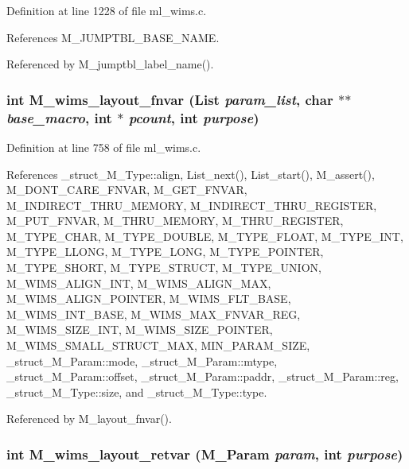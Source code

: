 Definition at line 1228 of file ml\_\-wims.c.

References M\_\-JUMPTBL\_\-BASE\_\-NAME.

Referenced by M\_\-jumptbl\_\-label\_\-name().
\subsubsection{\setlength{\rightskip}{0pt plus 5cm}int M\_\-wims\_\-layout\_\-fnvar (\bf{List} {\em param\_\-list}, char $\ast$$\ast$ {\em base\_\-macro}, int $\ast$ {\em pcount}, int {\em purpose})}\label{ml__wims_8c_89f126df7c79a4237631ff3654f631d0}




Definition at line 758 of file ml\_\-wims.c.

References \_\-struct\_\-M\_\-Type::align, List\_\-next(), List\_\-start(), M\_\-assert(), M\_\-DONT\_\-CARE\_\-FNVAR, M\_\-GET\_\-FNVAR, M\_\-INDIRECT\_\-THRU\_\-MEMORY, M\_\-INDIRECT\_\-THRU\_\-REGISTER, M\_\-PUT\_\-FNVAR, M\_\-THRU\_\-MEMORY, M\_\-THRU\_\-REGISTER, M\_\-TYPE\_\-CHAR, M\_\-TYPE\_\-DOUBLE, M\_\-TYPE\_\-FLOAT, M\_\-TYPE\_\-INT, M\_\-TYPE\_\-LLONG, M\_\-TYPE\_\-LONG, M\_\-TYPE\_\-POINTER, M\_\-TYPE\_\-SHORT, M\_\-TYPE\_\-STRUCT, M\_\-TYPE\_\-UNION, M\_\-WIMS\_\-ALIGN\_\-INT, M\_\-WIMS\_\-ALIGN\_\-MAX, M\_\-WIMS\_\-ALIGN\_\-POINTER, M\_\-WIMS\_\-FLT\_\-BASE, M\_\-WIMS\_\-INT\_\-BASE, M\_\-WIMS\_\-MAX\_\-FNVAR\_\-REG, M\_\-WIMS\_\-SIZE\_\-INT, M\_\-WIMS\_\-SIZE\_\-POINTER, M\_\-WIMS\_\-SMALL\_\-STRUCT\_\-MAX, MIN\_\-PARAM\_\-SIZE, \_\-struct\_\-M\_\-Param::mode, \_\-struct\_\-M\_\-Param::mtype, \_\-struct\_\-M\_\-Param::offset, \_\-struct\_\-M\_\-Param::paddr, \_\-struct\_\-M\_\-Param::reg, \_\-struct\_\-M\_\-Type::size, and \_\-struct\_\-M\_\-Type::type.

Referenced by M\_\-layout\_\-fnvar().
\subsubsection{\setlength{\rightskip}{0pt plus 5cm}int M\_\-wims\_\-layout\_\-retvar (\bf{M\_\-Param} {\em param}, int {\em purpose})}\label{ml__wims_8c_37808766c8dda87bcefdc1ff2485fb03}




